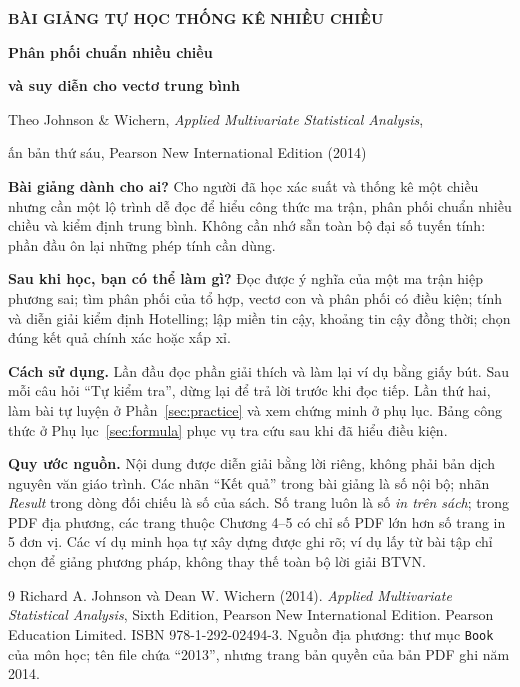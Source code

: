\documentclass[12pt,a4paper]{article}
\numberwithin{equation}{section}
\theoremstyle{definition}
\begin{document}
\begin{center}
 {\large\bfseries BÀI GIẢNG TỰ HỌC THỐNG KÊ NHIỀU CHIỀU}\par
 \bigskip
 {\LARGE\bfseries Phân phối chuẩn nhiều chiều}\par
 \medskip
 {\Large\bfseries và suy diễn cho vectơ trung bình}\par
 \bigskip
 Theo Johnson \& Wichern, \textit{Applied Multivariate Statistical Analysis},\par
 ấn bản thứ sáu, Pearson New International Edition (2014)
\end{center}
\bigskip
\noindent\textbf{Bài giảng dành cho ai?}
Cho người đã học xác suất và thống kê một chiều nhưng cần một lộ trình dễ đọc
để hiểu công thức ma trận, phân phối chuẩn nhiều chiều và kiểm định trung bình.
Không cần nhớ sẵn toàn bộ đại số tuyến tính: phần đầu ôn lại những phép tính cần dùng.

\noindent\textbf{Sau khi học, bạn có thể làm gì?}
Đọc được ý nghĩa của một ma trận hiệp phương sai; tìm phân phối của tổ hợp,
vectơ con và phân phối có điều kiện; tính và diễn giải kiểm định Hotelling;
lập miền tin cậy, khoảng tin cậy đồng thời; chọn đúng kết quả chính xác hoặc xấp xỉ.

\noindent\textbf{Cách sử dụng.}
Lần đầu đọc phần giải thích và làm lại ví dụ bằng giấy bút. Sau mỗi câu hỏi
``Tự kiểm tra'', dừng lại để trả lời trước khi đọc tiếp. Lần thứ hai,
làm bài tự luyện ở Phần~\ref{sec:practice} và xem chứng minh ở phụ lục.
Bảng công thức ở Phụ lục~\ref{sec:formula} phục vụ tra cứu sau khi đã hiểu điều kiện.

\noindent\textbf{Quy ước nguồn.}
Nội dung được diễn giải bằng lời riêng, không phải bản dịch nguyên văn giáo trình.
Các nhãn ``Kết quả'' trong bài giảng là số nội bộ; nhãn \textit{Result} trong dòng
đối chiếu là số của sách. Số trang luôn là số \emph{in trên sách}; trong PDF địa
phương, các trang thuộc Chương 4--5 có chỉ số PDF lớn hơn số trang in 5 đơn vị.
Các ví dụ minh họa tự xây dựng được ghi rõ; ví dụ lấy từ bài tập chỉ chọn để giảng
phương pháp, không thay thế toàn bộ lời giải BTVN.

\clearpage
\tableofcontents









\appendix

\clearpage
\begin{thebibliography}{9}
 Richard A. Johnson và Dean W. Wichern (2014).
\textit{Applied Multivariate Statistical Analysis}, Sixth Edition,
Pearson New International Edition. Pearson Education Limited.
ISBN 978-1-292-02494-3. Nguồn địa phương: thư mục \texttt{Book} của môn học;
tên file chứa ``2013'', nhưng trang bản quyền của bản PDF ghi năm 2014.
\end{thebibliography}
\end{document}
